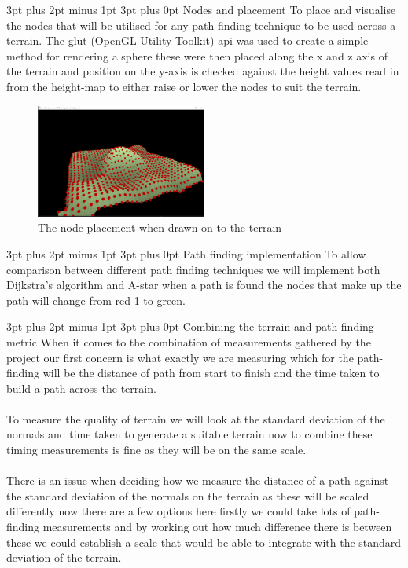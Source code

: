 \documentclass[12pt,a4paper]{article}
\makeatletter
\renewcommand\subsection{\@startsection {subsection}{1}{2mm} %
                               {3pt plus 2pt minus 1pt} %
                               {3pt plus 0pt} %
                               {\normalfont\bfseries}}
\makeatother
\begin{document}
\subsection{Nodes and placement} 
To place and visualise the nodes that will be utilised for any path finding technique to be used across a terrain. The glut (OpenGL Utility Toolkit) api was used to create a simple method for rendering a sphere these were then placed along the x and z axis of the terrain and position on the y-axis is checked against the height values read in from the height-map to either raise or lower the nodes to suit the terrain. 

\begin{figure}[ht!]
	\includegraphics[width=0.5\textwidth]{images/nodes}
	\caption{The node placement when drawn on to the terrain} \label{node}
\end{figure}

\subsection{Path finding implementation}
To allow comparison between different path finding techniques we will implement both Dijkstra's algorithm and A-star when a path is found the nodes that make up the path will change from red \ref{node} to green.  

\subsection{Combining the terrain and path-finding metric}
When it comes to the combination of measurements gathered by the project our first concern is what exactly we are measuring which for the path-finding will be the distance of path from start to finish and the time taken to build a path across the terrain.\\\\To measure the quality of terrain we will look at the standard deviation of the normals and time taken to generate a suitable terrain now to combine these timing measurements is fine as they will be on the same scale.\\\\ There is an issue when deciding how we measure the distance of a path against the standard deviation of the normals on the terrain as these will be scaled differently now there are a few options here firstly we could take lots of path-finding measurements and by working out how much difference there is between these we could establish a scale that would be able to integrate with the standard deviation of the terrain.      
\end{document}

